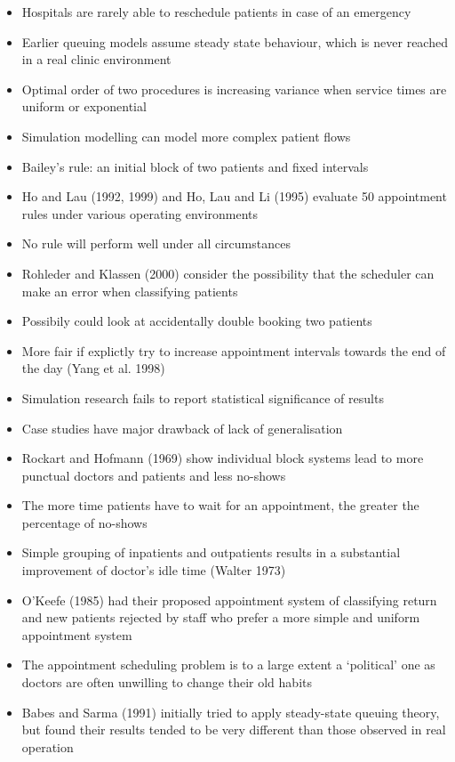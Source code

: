\documentclass{article}
\begin{document}
\begin{itemize}
    \item Hospitals are rarely able to reschedule patients in case of an emergency
    \item Earlier queuing models assume steady state behaviour, which is never reached in a real clinic environment
    \item Optimal order of two procedures is increasing variance when service times are uniform or exponential
    \item Simulation modelling can model more complex patient flows
    \item Bailey's rule: an initial block of two patients and fixed intervals
    \item Ho and Lau (1992, 1999) and Ho, Lau and Li (1995) evaluate 50 appointment rules under various operating environments
    \item No rule will perform well under all circumstances
    \item Rohleder and Klassen (2000) consider the possibility that the scheduler can make an error when classifying patients
    \item Possibily could look at accidentally double booking two patients
    \item More fair if explictly try to increase appointment intervals towards the end of the day (Yang et al. 1998)
    \item Simulation research fails to report statistical significance of results
    \item Case studies have major drawback of lack of generalisation
    \item Rockart and Hofmann (1969) show individual block systems lead to more punctual doctors and patients and less no-shows
    \item The more time patients have to wait for an appointment, the greater the percentage of no-shows
    \item Simple grouping of inpatients and outpatients results in a substantial improvement of doctor's idle time (Walter 1973)
    \item O'Keefe (1985) had their proposed appointment system of classifying return and new patients rejected by staff who prefer a more simple and uniform appointment system
    \item The appointment scheduling problem is to a large extent a `political' one as doctors are often unwilling to change their old habits
    \item Babes and Sarma (1991) initially tried to apply steady-state queuing theory, but found their results tended to be very different than those observed in real operation

\end{itemize}
\end{document}
